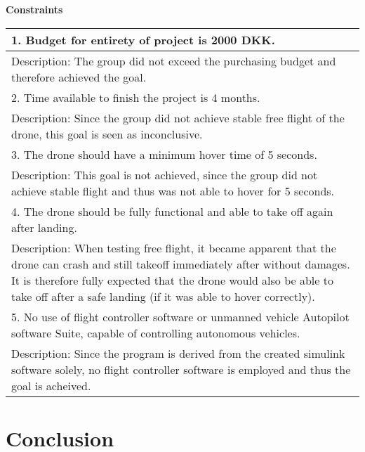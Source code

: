 \begin{center}
  \bigbreak
  \textbf{Constraints} 
  \bigbreak

  \begin{tabular}{| m{33em} |}
      \hline
      \color{ForestGreen}
      1. Budget for entirety of project is 2000 DKK.  \\ 
      \hline
      Description:  The group did not exceed the purchasing budget and therefore achieved the goal.\\ 
      \hline
      \hline
      \color{YellowOrange}
      2. Time available to finish the project is 4 months. \\ 
      \hline
      Description:  Since the group did not achieve stable free flight of the drone, this goal is seen as inconclusive.\\ 
      \hline
      \hline
      \color{BrickRed}
      3. The drone should have a minimum hover time of 5 
      seconds.\\
      \hline
      Description:   This goal is not achieved, since the group did not achieve stable flight and thus was not able to hover for 5 seconds.\\ 
      \hline
      \hline
      \color{ForestGreen}
      4. The drone should be fully functional and able 
      to take off again after landing.\\
      \hline
      Description: When testing free flight, it became apparent that the drone can crash and still takeoff immediately after without damages. It is therefore fully 
      expected that the drone would also be able to take off after a safe landing (if it was able to hover correctly).\\ 
      \hline
      \hline
      \color{ForestGreen}
      5. No use of flight controller software or unmanned 
      vehicle Autopilot software Suite, capable of 
      controlling autonomous vehicles.\\
      \hline
      Description:  Since the program is derived from the created simulink software solely, no flight controller software is employed and thus the goal is acheived. \\ 
      \hline
  \end{tabular}

\end{center}    

\section{Conclusion}


